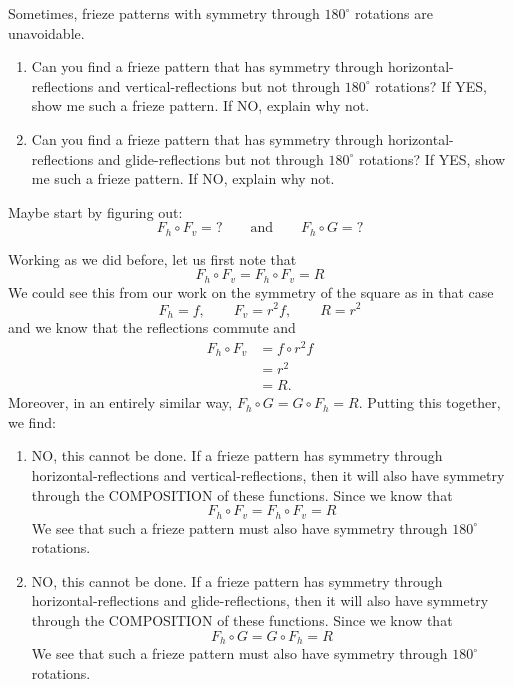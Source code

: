 \documentclass[noauthor,nooutcomes,hints        ]{ximera}
\begin{document}
\begin{question}
  Sometimes, frieze patterns with symmetry through $180^\circ$
  rotations are unavoidable.
  \begin{enumerate}
  \item Can you find a frieze pattern that has symmetry through
    horizontal-reflections and vertical-reflections but not through
    $180^\circ$ rotations? If YES, show me such a frieze pattern. If
    NO, explain why not.
  \item Can you find a frieze pattern that has symmetry through
    horizontal-reflections and glide-reflections but not through
    $180^\circ$ rotations? If YES, show me such a frieze pattern. If
    NO, explain why not.
  \end{enumerate}
  \begin{hint}
    Maybe start by figuring out:
    \[
    F_h \circ F_v = ? \qquad\text{and}\qquad F_h \circ G = ?
    \]
  \end{hint}
  \begin{freeResponse}
    Working as we did before, let us first note that
    \[
    F_h \circ F_v = F_h \circ F_v= R
    \]
    We could see this from our work on the symmetry of the square as in that case
    \[
    F_h = f, \qquad F_v = r^2 f, \qquad R = r^2
    \]
    and we know that the reflections commute and 
    \begin{align*}
      F_h \circ F_v &= f \circ r^2 f \\
      &= r^2\\
      &= R.
    \end{align*}
    Moreover, in an entirely similar way, $F_h \circ G = G\circ F_h =
    R$. Putting this together, we find:
    \begin{enumerate}
    \item NO, this cannot be done. If a frieze pattern has symmetry
      through horizontal-reflections and vertical-reflections, then it
      will also have symmetry through the COMPOSITION of these
      functions. Since we know that
      \[
      F_h \circ F_v = F_h \circ F_v= R
      \]
      We see that such a frieze pattern must also have symmetry
      through $180^\circ$ rotations.
    \item NO, this cannot be done.  If a frieze pattern has symmetry
      through horizontal-reflections and glide-reflections, then it
      will also have symmetry through the COMPOSITION of these
      functions. Since we know that
      \[
      F_h \circ G = G\circ F_h =
      R
      \]
      We see that such a frieze pattern must also have symmetry
      through $180^\circ$ rotations.
    \end{enumerate}
  \end{freeResponse}
\end{question}
\end{document}

